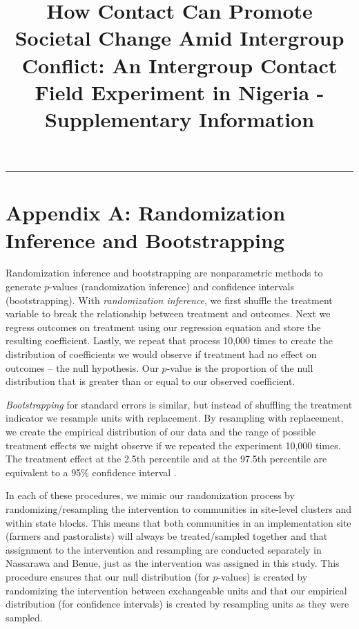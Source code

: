 \documentclass[
]{article}
\title{How Contact Can Promote Societal Change Amid Intergroup Conflict:
An Intergroup Contact Field Experiment in Nigeria - Supplementary
Information}
\author{}
\date{\vspace{-2.5em}}
\begin{document}
\maketitle

{
\setcounter{tocdepth}{1}
\tableofcontents
}
\begin{center}\rule{0.5\linewidth}{0.5pt}\end{center}

\newpage

\hypertarget{appendix-a-randomization-inference-and-bootstrapping}{%
\section{Appendix A: Randomization Inference and
Bootstrapping}\label{appendix-a-randomization-inference-and-bootstrapping}}

Randomization inference and bootstrapping are nonparametric methods to
generate \(p\)-values (randomization inference) and confidence intervals
(bootstrapping). With \emph{randomization inference}, we first shuffle
the treatment variable to break the relationship between treatment and
outcomes. Next we regress outcomes on treatment using our regression
equation and store the resulting coefficient. Lastly, we repeat that
process 10,000 times to create the distribution of coefficients we would
observe if treatment had no effect on outcomes -- the null hypothesis.
Our \(p\)-value is the proportion of the null distribution that is
greater than or equal to our observed coefficient.

\emph{Bootstrapping} for standard errors is similar, but instead of
shuffling the treatment indicator we resample units with replacement. By
resampling with replacement, we create the empirical distribution of our
data and the range of possible treatment effects we might observe if we
repeated the experiment 10,000 times. The treatment effect at the 2.5th
percentile and at the 97.5th percentile are equivalent to a 95\%
confidence interval .

In each of these procedures, we mimic our randomization process by
randomizing/resampling the intervention to communities in site-level
clusters and within state blocks. This means that both communities in an
implementation site (farmers and pastoralists) will always be
treated/sampled together and that assignment to the intervention and
resampling are conducted separately in Nassarawa and Benue, just as the
intervention was assigned in this study. This procedure ensures that our
null distribution (for \(p\)-values) is created by randomizing the
intervention between exchangeable units and that our empirical
distribution (for confidence intervals) is created by resampling units
as they were sampled.
\end{document}

